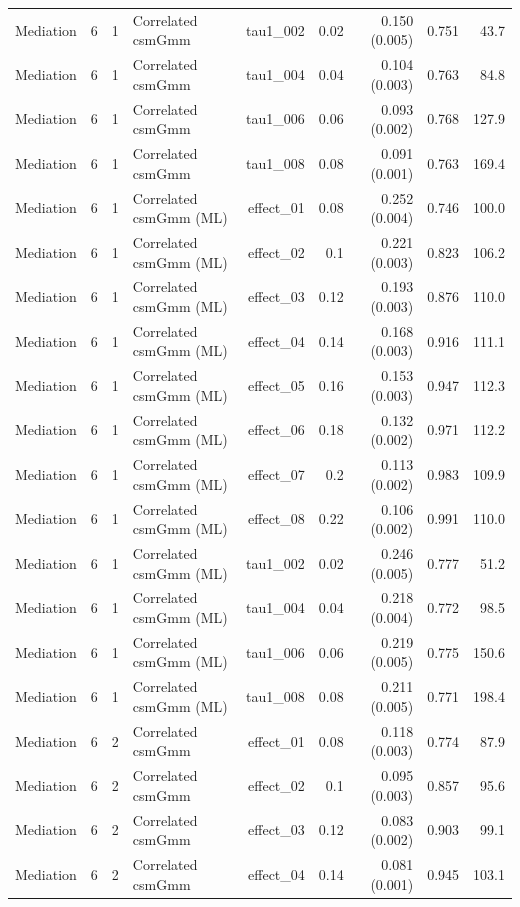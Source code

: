 \begin{longtable}{lcclrrrrr}
Mediation & 6 & 1 & Correlated csmGmm & tau1\_002 & 0.02 & 0.150 (0.005) & 0.751 & 43.7\\
Mediation & 6 & 1 & Correlated csmGmm & tau1\_004 & 0.04 & 0.104 (0.003) & 0.763 & 84.8\\
Mediation & 6 & 1 & Correlated csmGmm & tau1\_006 & 0.06 & 0.093 (0.002) & 0.768 & 127.9\\
Mediation & 6 & 1 & Correlated csmGmm & tau1\_008 & 0.08 & 0.091 (0.001) & 0.763 & 169.4\\
Mediation & 6 & 1 & Correlated csmGmm (ML) & effect\_01 & 0.08 & 0.252 (0.004) & 0.746 & 100.0\\
Mediation & 6 & 1 & Correlated csmGmm (ML) & effect\_02 & 0.1 & 0.221 (0.003) & 0.823 & 106.2\\
Mediation & 6 & 1 & Correlated csmGmm (ML) & effect\_03 & 0.12 & 0.193 (0.003) & 0.876 & 110.0\\
Mediation & 6 & 1 & Correlated csmGmm (ML) & effect\_04 & 0.14 & 0.168 (0.003) & 0.916 & 111.1\\
Mediation & 6 & 1 & Correlated csmGmm (ML) & effect\_05 & 0.16 & 0.153 (0.003) & 0.947 & 112.3\\
Mediation & 6 & 1 & Correlated csmGmm (ML) & effect\_06 & 0.18 & 0.132 (0.002) & 0.971 & 112.2\\
Mediation & 6 & 1 & Correlated csmGmm (ML) & effect\_07 & 0.2 & 0.113 (0.002) & 0.983 & 109.9\\
Mediation & 6 & 1 & Correlated csmGmm (ML) & effect\_08 & 0.22 & 0.106 (0.002) & 0.991 & 110.0\\
Mediation & 6 & 1 & Correlated csmGmm (ML) & tau1\_002 & 0.02 & 0.246 (0.005) & 0.777 & 51.2\\
Mediation & 6 & 1 & Correlated csmGmm (ML) & tau1\_004 & 0.04 & 0.218 (0.004) & 0.772 & 98.5\\
Mediation & 6 & 1 & Correlated csmGmm (ML) & tau1\_006 & 0.06 & 0.219 (0.005) & 0.775 & 150.6\\
Mediation & 6 & 1 & Correlated csmGmm (ML) & tau1\_008 & 0.08 & 0.211 (0.005) & 0.771 & 198.4\\
Mediation & 6 & 2 & Correlated csmGmm & effect\_01 & 0.08 & 0.118 (0.003) & 0.774 & 87.9\\
Mediation & 6 & 2 & Correlated csmGmm & effect\_02 & 0.1 & 0.095 (0.003) & 0.857 & 95.6\\
Mediation & 6 & 2 & Correlated csmGmm & effect\_03 & 0.12 & 0.083 (0.002) & 0.903 & 99.1\\
Mediation & 6 & 2 & Correlated csmGmm & effect\_04 & 0.14 & 0.081 (0.001) & 0.945 & 103.1\\

\end{longtable}

